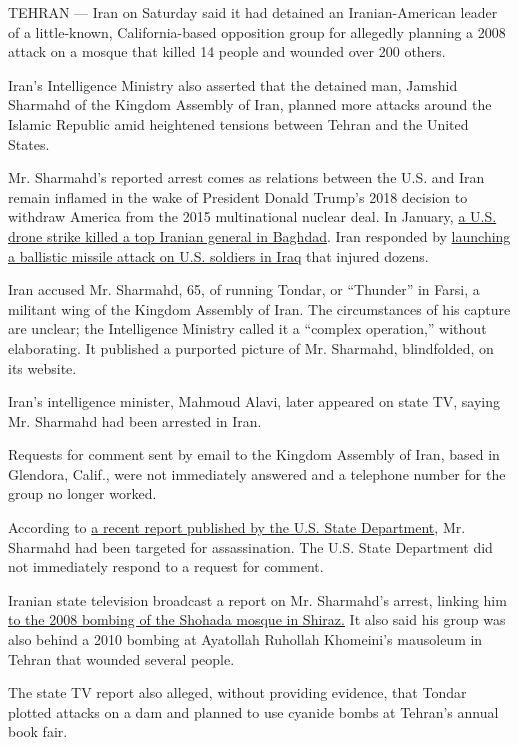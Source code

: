 TEHRAN --- Iran on Saturday said it had detained an Iranian-American
leader of a little-known, California-based opposition group for
allegedly planning a 2008 attack on a mosque that killed 14 people and
wounded over 200 others.

Iran's Intelligence Ministry also asserted that the detained man,
Jamshid Sharmahd of the Kingdom Assembly of Iran, planned more attacks
around the Islamic Republic amid heightened tensions between Tehran and
the United States.

Mr. Sharmahd's reported arrest comes as relations between the U.S. and
Iran remain inflamed in the wake of President Donald Trump's 2018
decision to withdraw America from the 2015 multinational nuclear deal.
In January, \href{https://apnews.com/5597ff0f046a67805cc233d5933a53ed}{a
U.S. drone strike killed a top Iranian general in Baghdad}. Iran
responded by
\href{https://apnews.com/add7a702258b4419d796aa5f48e577fc}{launching a
ballistic missile attack on U.S. soldiers in Iraq} that injured dozens.

Iran accused Mr. Sharmahd, 65, of running Tondar, or ``Thunder'' in
Farsi, a militant wing of the Kingdom Assembly of Iran. The
circumstances of his capture are unclear; the Intelligence Ministry
called it a ``complex operation,'' without elaborating. It published a
purported picture of Mr. Sharmahd, blindfolded, on its website.

Iran's intelligence minister, Mahmoud Alavi, later appeared on state TV,
saying Mr. Sharmahd had been arrested in Iran.

Requests for comment sent by email to the Kingdom Assembly of Iran,
based in Glendora, Calif., were not immediately answered and a telephone
number for the group no longer worked.

According to
\href{https://www.state.gov/outlaw-regime-a-chronicle-of-irans-destructive-activities/}{a
recent report published by the U.S. State Department}, Mr. Sharmahd had
been targeted for assassination. The U.S. State Department did not
immediately respond to a request for comment.

Iranian state television broadcast a report on Mr. Sharmahd's arrest,
linking him
\href{https://www.nytimes.com/2008/04/13/world/middleeast/13shiraz.html}{to
the 2008 bombing of the Shohada mosque in Shiraz.} It also said his
group was also behind a 2010 bombing at Ayatollah Ruhollah Khomeini's
mausoleum in Tehran that wounded several people.

The state TV report also alleged, without providing evidence, that
Tondar plotted attacks on a dam and planned to use cyanide bombs at
Tehran's annual book fair.

